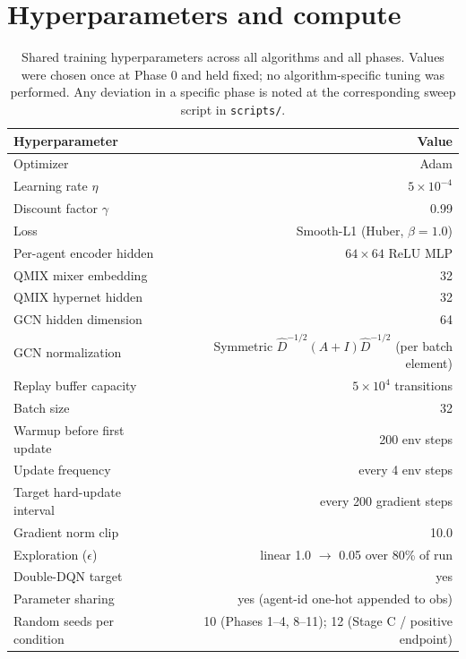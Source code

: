 \documentclass[manuscript, screen, review]{jair}
\begin{document}
\section{Hyperparameters and compute}
\label{app:hparams}

\begin{table}[!ht]
  \centering
  \small
  \caption{Shared training hyperparameters across all algorithms and
  all phases. Values were chosen once at Phase 0 and held fixed; no
  algorithm-specific tuning was performed. Any deviation in a specific
  phase is noted at the corresponding sweep script in \texttt{scripts/}.}
  \label{tab:hparams_shared}
  \begin{tabular}{lr}
    \toprule
    Hyperparameter & Value \\
    \midrule
    Optimizer                    & Adam \\
    Learning rate $\eta$         & $5 \times 10^{-4}$ \\
    Discount factor $\gamma$     & 0.99 \\
    Loss                         & Smooth-L1 (Huber, $\beta=1.0$) \\
    Per-agent encoder hidden     & $64 \times 64$ ReLU MLP \\
    QMIX mixer embedding         & 32 \\
    QMIX hypernet hidden         & 32 \\
    GCN hidden dimension         & 64 \\
    GCN normalization            & Symmetric $\hat D^{-1/2}(A+I)\hat D^{-1/2}$ (per batch element) \\
    Replay buffer capacity       & $5 \times 10^4$ transitions \\
    Batch size                   & 32 \\
    Warmup before first update   & 200 env steps \\
    Update frequency             & every 4 env steps \\
    Target hard-update interval  & every 200 gradient steps \\
    Gradient norm clip           & 10.0 \\
    Exploration ($\epsilon$)     & linear 1.0 $\rightarrow$ 0.05 over 80\% of run \\
    Double-DQN target            & yes \\
    Parameter sharing            & yes (agent-id one-hot appended to obs) \\
    Random seeds per condition   & 10 (Phases 1--4, 8--11); 12 (Stage C / positive endpoint) \\
    \bottomrule
  \end{tabular}
\end{table}
\end{document}
